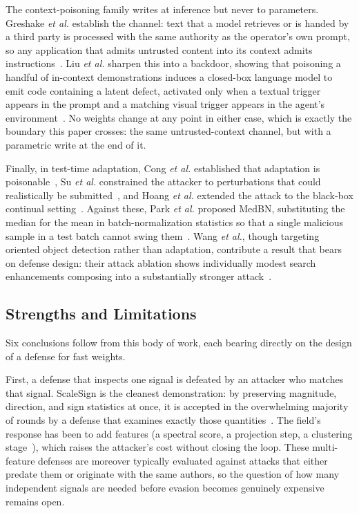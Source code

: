 \documentclass[journal]{IEEEtran}
\begin{document}
The context-poisoning family writes at inference but never to parameters. Greshake
\emph{et al.} establish the channel: text that a model retrieves or is handed by a
third party is processed with the same authority as the operator's own prompt, so
any application that admits untrusted content into its context admits
instructions~\cite{greshake2023injection}. Liu \emph{et al.} sharpen this into a
backdoor, showing that poisoning a handful of in-context demonstrations induces a
closed-box language model to emit code containing a latent defect, activated only
when a textual trigger appears in the prompt and a matching visual trigger appears
in the agent's environment~\cite{liu2025contextual}. No weights change at any point
in either case, which is exactly the boundary this paper crosses: the same
untrusted-context channel, but with a parametric write at the end of it.

Finally, in test-time adaptation, Cong \emph{et al.} established that adaptation is
poisonable~\cite{cong2024ttp}, Su \emph{et al.} constrained the attacker to
perturbations that could realistically be submitted~\cite{su2025realistic}, and
Hoang \emph{et al.} extended the attack to the black-box continual
setting~\cite{hoang2024rip}. Against these, Park \emph{et al.} proposed MedBN,
substituting the median for the mean in batch-normalization statistics so that a
single malicious sample in a test batch cannot swing them~\cite{park2024medbn}.
Wang \emph{et al.}, though targeting oriented object detection rather than
adaptation, contribute a result that bears on defense design: their attack ablation
shows individually modest search enhancements composing into a substantially
stronger attack~\cite{wang2026insulator}.

\subsection{Strengths and Limitations}

Six conclusions follow from this body of work, each bearing directly on the design
of a defense for fast weights.

First, a defense that inspects one signal is defeated by an attacker who matches
that signal. ScaleSign is the cleanest demonstration: by preserving magnitude,
direction, and sign statistics at once, it is accepted in the overwhelming majority
of rounds by a defense that examines exactly those
quantities~\cite{yang2025scalesign}. The field's response has been to add features
(a spectral score, a projection step, a clustering stage~\cite{yang2025scalesign,
zukaib2026d3flids}), which raises the attacker's cost without closing the loop.
These multi-feature defenses are moreover typically evaluated against attacks that
either predate them or originate with the same authors, so the question of how many
independent signals are needed before evasion becomes genuinely expensive remains
open.
\end{document}
